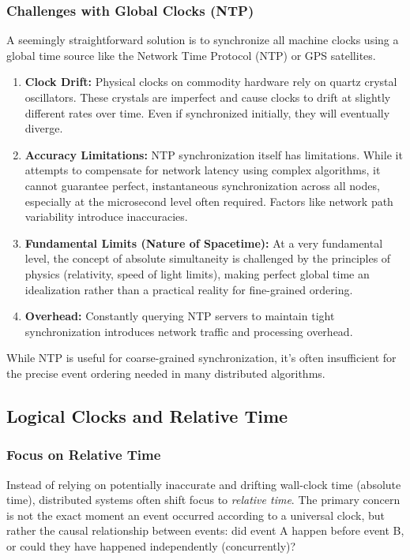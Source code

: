 \subsubsection{Challenges with Global Clocks (NTP)}
A seemingly straightforward solution is to synchronize all machine clocks using a global time source like the Network Time Protocol (NTP) or GPS satellites.
\begin{enumerate}[label=\roman*), noitemsep]
    \item \textbf{Clock Drift:} Physical clocks on commodity hardware rely on quartz crystal oscillators. These crystals are imperfect and cause clocks to drift at slightly different rates over time. Even if synchronized initially, they will eventually diverge.
    \item \textbf{Accuracy Limitations:} NTP synchronization itself has limitations. While it attempts to compensate for network latency using complex algorithms, it cannot guarantee perfect, instantaneous synchronization across all nodes, especially at the microsecond level often required. Factors like network path variability introduce inaccuracies.
    \item \textbf{Fundamental Limits (Nature of Spacetime):} At a very fundamental level, the concept of absolute simultaneity is challenged by the principles of physics (relativity, speed of light limits), making perfect global time an idealization rather than a practical reality for fine-grained ordering.
    \item \textbf{Overhead:} Constantly querying NTP servers to maintain tight synchronization introduces network traffic and processing overhead.
\end{enumerate}
While NTP is useful for coarse-grained synchronization, it's often insufficient for the precise event ordering needed in many distributed algorithms.

\subsection{Logical Clocks and Relative Time}

\subsubsection{Focus on Relative Time}
Instead of relying on potentially inaccurate and drifting wall-clock time (absolute time), distributed systems often shift focus to \textit{relative time}. The primary concern is not the exact moment an event occurred according to a universal clock, but rather the causal relationship between events: did event A happen before event B, or could they have happened independently (concurrently)?


